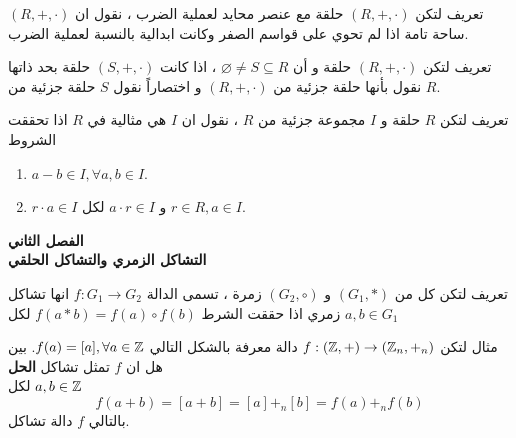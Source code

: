	\begin{frame}
		\begin{exampleblock}{تعريف}
			 	لتكن $(R, +, \cdot)$ حلقة مع عنصر محايد لعملية الضرب ، نقول ان $(R, +, \cdot)$ ساحة تامة اذا لم تحوي على قواسم الصفر وكانت ابدالية بالنسبة لعملية الضرب.
		\end{exampleblock}
		
		\pause
		\begin{exampleblock}{تعريف}
			لتكن $(R, +, \cdot)$ حلقة و أن $\varnothing\neq S\subseteq R$ ، اذا كانت $(S, +, \cdot)$ حلقة بحد ذاتها نقول بأنها حلقة جزئية من $(R, +, \cdot)$ و اختصاراً نقول $S$ حلقة جزئية من $R$.
		\end{exampleblock}
		
		\pause
		\begin{exampleblock}{تعريف}
			 	لتكن $R$ حلقة و $I$ مجموعة جزئية من $R$ ، نقول ان $I$ هي مثالية في $R$ اذا تحققت الشروط
			\begin{enumerate}
				\item $a-b\in I, \forall a, b\in I$.
				\item $r\cdot a \in I$ و $a\cdot r\in I$ لكل $r\in R, a\in I$.
			\end{enumerate}
		\end{exampleblock}
	\end{frame}
	
	\begin{frame}
		\Huge
		\begin{center}
			\textbf{الفصل الثاني}\\
			\textbf{التشاكل الزمري والتشاكل الحلقي}
		\end{center}
	\end{frame}
	
	\begin{frame}
		\begin{exampleblock}{تعريف}
				لتكن كل من $(G_1, *)$ و $(G_2, \circ)$ زمرة ، تسمى الدالة $f : G_1\to G_2 $ انها تشاكل زمري اذا حققت الشرط  $f(a * b) = f(a) \circ f(b)$ لكل $a, b \in G_1 $ 
		\end{exampleblock}
		
		\pause
		\begin{exampleblock}{مثال}
			لتكن 
			$f : (\mathbb{Z}, +) \to (\mathbb{Z}_n, +_n)$ دالة معرفة بالشكل التالي $f(a) = [a], \forall a\in \mathbb{Z}$. بين هل ان $f$ تمثل تشاكل
		\noindent
		\textbf{الحل}\\
		\noindent
		لكل $a, b\in \mathbb{Z}$
		\[
		f(a + b) = [a + b] = [a] +_n [b] = f(a) +_n f(b)
		\]
		بالتالي $f$ دالة تشاكل.
		\end{exampleblock}
	\end{frame}
			
